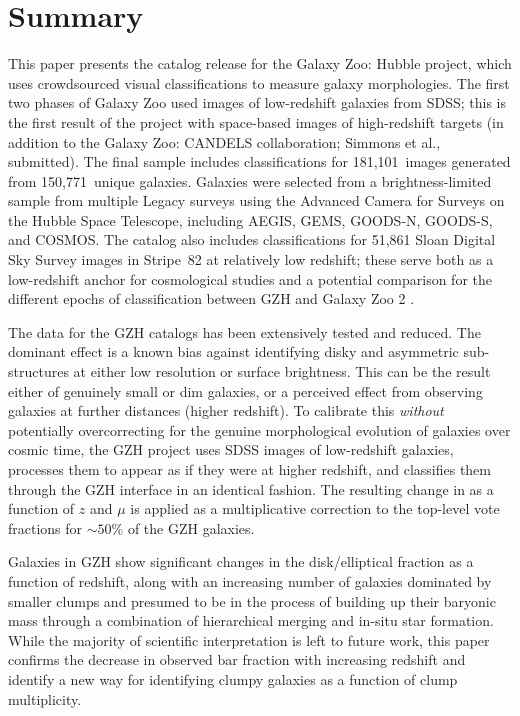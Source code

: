 \documentclass[twocolumn]{aastex6}
\begin{document}
\section{Summary}\label{sec:summary}


This paper presents the catalog release for the Galaxy Zoo: Hubble project, which uses crowdsourced visual classifications to measure galaxy morphologies. The first two phases of Galaxy Zoo \citep{lin11,wil13} used images of low-redshift galaxies from SDSS; this is the first result of the project with space-based images of high-redshift targets (in addition to the Galaxy Zoo: CANDELS collaboration; Simmons et al., submitted). The final sample includes classifications for 181,101~images generated from 150,771~unique galaxies. Galaxies were selected from a brightness-limited sample from multiple Legacy surveys using the Advanced Camera for Surveys on the Hubble Space Telescope, including AEGIS, GEMS, GOODS-N, GOODS-S, and COSMOS. The catalog also includes classifications for 51,861 Sloan Digital Sky Survey images in Stripe~82 at relatively low redshift; these serve both as a low-redshift anchor for cosmological studies and a potential comparison for the different epochs of classification between GZH and Galaxy Zoo 2 \citep{wil13}. 

The data for the GZH catalogs has been extensively tested and reduced. The dominant effect is a known bias against identifying disky and asymmetric sub-structures at either low resolution or surface brightness. This can be the result either of genuinely small or dim galaxies, or a perceived effect from observing galaxies at further distances (higher redshift). To calibrate this \emph{without} potentially overcorrecting for the genuine morphological evolution of galaxies over cosmic time, the GZH project uses SDSS images of low-redshift galaxies, processes them to appear as if they were at higher redshift, and classifies them through the GZH interface in an identical fashion. The resulting change in \ffeatures{} as a function of $z$ and $\mu$ is applied as a multiplicative correction to the top-level vote fractions for $\sim50\%$ of the GZH galaxies. 

Galaxies in GZH show significant changes in the disk/elliptical fraction as a function of redshift, along with an increasing number of galaxies dominated by smaller clumps and presumed to be in the process of building up their baryonic mass through a combination of hierarchical merging and in-situ star formation. While the majority of scientific interpretation is left to future work, this paper confirms the decrease in observed bar fraction with increasing redshift \citep{mel14} and identify a new way for identifying clumpy galaxies as a function of clump multiplicity.
\end{document}

